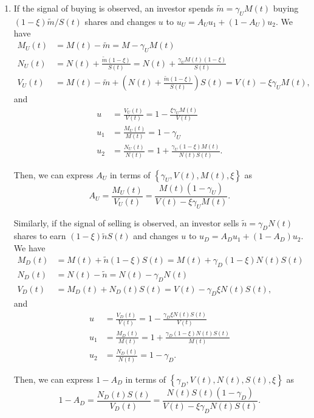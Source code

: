\documentclass[runningheads]{llncs}
\begin{document}
\begin{enumerate}
    \item If the signal of buying is observed, an investor spends $\tilde{m}=\gamma_U M(t)$ buying $(1-\xi)\tilde{m}/S(t)$ shares and changes $u$ to $u_U=A_U u_1 + (1-A_U)u_2$. We have
\begin{align}
    M_U(t)&=M(t)-\tilde{m}=M-\gamma_U M(t)\\
    N_U(t)&=N(t)+\frac{\tilde{m}(1-\xi)}{S(t)}=N(t)+\frac{\gamma_U M(t)(1-\xi)}{S(t)}\\
    V_U(t)&=M(t)-\tilde{m}+\left( N(t)+\frac{\tilde{m}(1-\xi)}{S(t)} \right) S(t)=V(t)-\xi\gamma_U M(t),
\end{align}
and
\begin{align}
    u&=\frac{V_U(t)}{V(t)}=1-\frac{\xi\gamma_U M(t)}{V(t)}\\
    u_1&=\frac{M_U(t)}{M(t)}=1-\gamma_U\\
    u_2&=\frac{N_U(t)}{N(t)}=1+\frac{\gamma_U(1-\xi)M(t)}{N(t)S(t)}.
\end{align}

Then, we can express $A_U$ in terms of $\left\{\gamma_U, V(t), M(t), \xi\right\}$ as
\begin{equation}\label{eq:au}
    A_U=\frac{M_U(t)}{V_U(t)}=\frac{M(t)\left( 1-\gamma_U \right) }{V(t)-\xi\gamma_U M(t)}.
\end{equation}

Similarly, if the signal of selling is observed, an investor sells $\tilde{n}=\gamma_D N(t)$ shares to earn $(1-\xi)\tilde{n}S(t)$ and changes $u$ to $u_D=A_D u_1 + (1-A_D)u_2$. We have
\begin{align}
    M_D(t)&=M(t)+\tilde{n}(1-\xi)S(t)=M(t)+\gamma_D(1-\xi) N(t)S(t)\\
    N_D(t)&=N(t)-\tilde{n}=N(t)-\gamma_D N(t)\\
    V_D(t)&=M_D(t)+N_D(t)S(t)=V(t)-\gamma_D\xi N(t)S(t),
\end{align}
and
\begin{align}
    u&=\frac{V_D(t)}{V(t)}=1-\frac{\gamma_D\xi N(t)S(t)}{V(t)}\\
    u_1&=\frac{M_D(t)}{M(t)}=1+\frac{\gamma_D(1-\xi) N(t)S(t)}{M(t)}\\
    u_2&=\frac{N_D(t)}{N(t)}=1-\gamma_D.
\end{align}
    
Then, we can express $1-A_D$ in terms of $\left\{\gamma_D, V(t), N(t), S(t), \xi\right\}$ as
\begin{equation}\label{eq:ad}
    1-A_D=\frac{N_D(t)S(t)}{V_D(t)}=\frac{N(t)S(t)\left( 1-\gamma_D \right) }{V(t)-\xi\gamma_D N(t) S(t)}.
\end{equation}


\end{enumerate}
\end{document}
